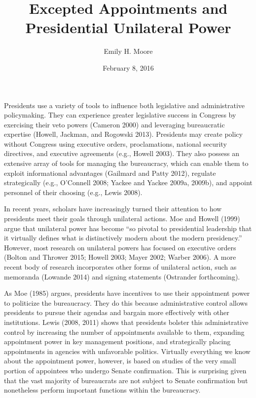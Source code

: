 \documentclass[12pt]{article}
\title{Excepted Appointments and Presidential Unilateral Power}
\date{February 8, 2016}
\author{Emily H. Moore}
\begin{document}

\maketitle
\parindent=0.5in
\parskip=0.01in
\doublespacing

Presidents use a variety of tools to influence both legislative and administrative policymaking. They can experience greater legislative success in Congress by exercising their veto powers (Cameron 2000) and leveraging bureaucratic expertise (Howell, Jackman, and Rogowski 2013). Presidents may create policy without Congress using executive orders, proclamations, national security directives, and executive agreements (e.g., Howell 2003). They  also possess an extensive array of tools for managing the bureaucracy, which can enable them to exploit informational advantages (Gailmard and Patty 2012), regulate strategically (e.g., O'Connell 2008; Yackee and Yackee 2009a, 2009b), and appoint personnel of their choosing (e.g., Lewis 2008). 

In recent years, scholars have increasingly turned their attention to how presidents meet their goals through unilateral actions. Moe and Howell (1999) argue that unilateral power has become ``so pivotal to presidential leadership that it virtually defines what is distinctively modern about the modern presidency.'' However, most research on unilateral powers has focused on executive orders (Bolton and Thrower 2015; Howell 2003; Mayer 2002; Warber 2006). A more recent body of research incorporates other forms of unilateral action, such as memoranda (Lowande 2014) and signing statements (Ostrander forthcoming).

	As Moe (1985) argues, presidents have incentives to use their appointment power to politicize the bureaucracy. They do this because administrative control allows presidents to pursue their agendas and bargain more effectively with other institutions.  Lewis (2008, 2011) shows that presidents bolster this administrative control by increasing the number of appointments available to them, expanding appointment power in key management positions, and strategically placing appointments in agencies with unfavorable politics. Virtually everything we know about the appointment power, however, is based on studies of the very small portion of appointees who undergo Senate confirmation. This is surprising given that the vast majority of bureaucrats are not subject to Senate confirmation but nonetheless perform important functions within the bureaucracy.
	
\end{document}
